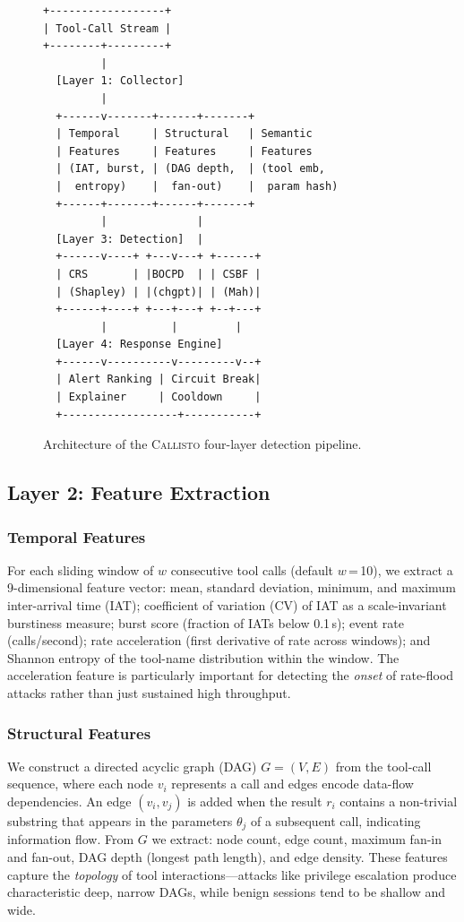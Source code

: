 \documentclass[conference,compsoc]{IEEEtran}
\newcommand{\system}{\textsc{Callisto}}
\begin{document}
\begin{figure}[t]
\centering
\small
\begin{verbatim}
+------------------+
| Tool-Call Stream |
+--------+---------+
         |
  [Layer 1: Collector]
         |
  +------v-------+------+-------+
  | Temporal     | Structural   | Semantic
  | Features     | Features     | Features
  | (IAT, burst, | (DAG depth,  | (tool emb,
  |  entropy)    |  fan-out)    |  param hash)
  +------+-------+------+-------+
         |              |
  [Layer 3: Detection]  |
  +------v----+ +---v---+ +------+
  | CRS       | |BOCPD  | | CSBF |
  | (Shapley) | |(chgpt)| | (Mah)|
  +------+----+ +---+---+ +--+---+
         |          |         |
  [Layer 4: Response Engine]
  +------v----------v---------v--+
  | Alert Ranking | Circuit Break|
  | Explainer     | Cooldown     |
  +------------------+-----------+
\end{verbatim}
\caption{Architecture of the \system{} four-layer detection pipeline.}
\label{fig:arch}
\end{figure}

\subsection{Layer 2: Feature Extraction}

\subsubsection{Temporal Features}
For each sliding window of $w$ consecutive tool calls (default $w$\,=\,10), we extract a 9-dimensional feature vector: mean, standard deviation, minimum, and maximum inter-arrival time (IAT); coefficient of variation (CV) of IAT as a scale-invariant burstiness measure; burst score (fraction of IATs below 0.1\,s); event rate (calls/second); rate acceleration (first derivative of rate across windows); and Shannon entropy of the tool-name distribution within the window. The acceleration feature is particularly important for detecting the \emph{onset} of rate-flood attacks rather than just sustained high throughput.

\subsubsection{Structural Features}
We construct a directed acyclic graph (DAG) $G = (V, E)$ from the tool-call sequence, where each node $v_i$ represents a call and edges encode data-flow dependencies. An edge $(v_i, v_j)$ is added when the result $r_i$ contains a non-trivial substring that appears in the parameters $\theta_j$ of a subsequent call, indicating information flow. From $G$ we extract: node count, edge count, maximum fan-in and fan-out, DAG depth (longest path length), and edge density. These features capture the \emph{topology} of tool interactions---attacks like privilege escalation produce characteristic deep, narrow DAGs, while benign sessions tend to be shallow and wide.
\end{document}
